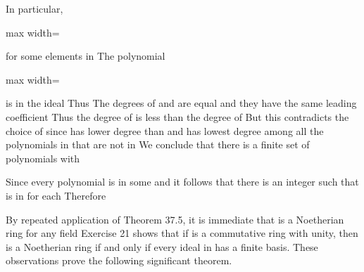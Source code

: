 \documentclass[11pt,oneside]{article}
\begin{document}
\begin{BookBody}
\noindent In particular,

\begin{center}\begin{adjustbox}{max width=\linewidth}\end{adjustbox}\end{center}

\noindent for some elements  in  The polynomial

\begin{center}\begin{adjustbox}{max width=\linewidth}\end{adjustbox}\end{center}

\noindent is in the ideal  Thus  The degrees of  and  are equal and they have the same leading coefficient  Thus the degree of  is less than the degree of  But this contradicts the choice of  since  has lower degree than  and  has lowest degree among all the polynomials in  that are not in  We conclude that there is a finite set of polynomials with 

Since every polynomial  is in some  and  it follows that there is an integer  such that  is in  for each  Therefore\BookEnd{\blacklozenge}

By repeated application of Theorem 37.5, it is immediate that  is a Noetherian ring for any field  Exercise 21 shows that if  is a commutative ring with unity, then  is a Noetherian ring if and only if every ideal  in  has a finite basis. These observations prove the following significant theorem.


\end{BookBody}
\end{document}
